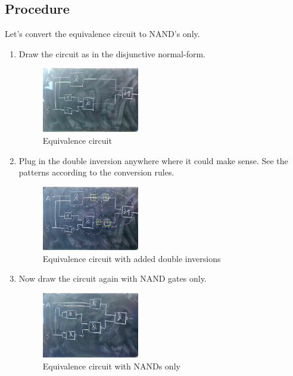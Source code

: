 \documentclass[10pt,a4paper]{article}
\begin{document}
\subsection{Procedure}
Let's convert the equivalence circuit to NAND's only. 
\begin{enumerate}
 \item Draw the circuit as in the disjunctive normal-form.
     \begin{figure}[H]
      \centering
      \includegraphics[width=0.4\textwidth]{eq1}%
      \caption{Equivalence circuit}%
      \label{fig:eq1}
    \end{figure}
 \item Plug in the double inversion anywhere where it could make sense. See the patterns according to the conversion rules.
      \begin{figure}[H]
      \centering
      \includegraphics[width=0.4\textwidth]{eq2}%
      \caption{Equivalence circuit with added double inversions}%
      \label{fig:eq2}
    \end{figure}
 \item Now draw the circuit again with NAND gates only.
      \begin{figure}[H]
      \centering
      \includegraphics[width=0.4\textwidth]{eq3}%
      \caption{Equivalence circuit with NANDs only}%
      \label{fig:eq3}
    \end{figure}
\end{enumerate}
\end{document}
